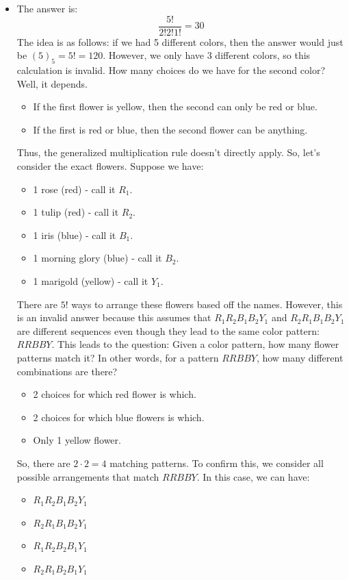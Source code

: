 \documentclass[letterpaper]{article}
\begin{document}
\begin{itemize}
    \item The answer is:
    \[\frac{5!}{2!2!1!} = 30\]
    The idea is as follows: if we had 5 different colors, then the answer would just be $(5)_5 = 5! = 120$. However, we only have 3 different colors, so this calculation is invalid. How many choices do we have for the second color? Well, it depends.
    \begin{itemize}
        \item If the first flower is yellow, then the second can only be red or blue.
        \item If the first is red or blue, then the second flower can be anything.
    \end{itemize}
    Thus, the generalized multiplication rule doesn't directly apply. So, let's consider the exact flowers. Suppose we have:
    \begin{itemize}
        \item 1 rose (red) - call it $R_1$. 
        \item 1 tulip (red) - call it $R_2$. 
        \item 1 iris (blue) - call it $B_1$. 
        \item 1 morning glory (blue) - call it $B_2$. 
        \item 1 marigold (yellow) - call it $Y_1$. 
    \end{itemize}
    There are $5!$ ways to arrange these flowers based off the names. However, this is an invalid answer because this assumes that $R_1 R_2 B_1 B_2 Y_1$ and $R_2 R_1 B_1 B_2 Y_1$ are different sequences even though they lead to the same color pattern: $RRBBY$. This leads to the question: Given a color pattern, how many flower patterns match it? In other words, for a pattern $RRBBY$, how many different combinations are there? 
    \begin{itemize}
        \item 2 choices for which red flower is which. 
        \item 2 choices for which blue flowers is which.
        \item Only 1 yellow flower. 
    \end{itemize}
    
    So, there are $2 \cdot 2 = 4$ matching patterns. To confirm this, we consider all possible arrangements that match $RRBBY$. In this case, we can have:
    \begin{itemize}
        \item $R_1 R_2 B_1 B_2 Y_1$
        \item $R_2 R_1 B_1 B_2 Y_1$
        \item $R_1 R_2 B_2 B_1 Y_1$
        \item $R_2 R_1 B_2 B_1 Y_1$
    \end{itemize}
    

\end{itemize}
\end{document}
